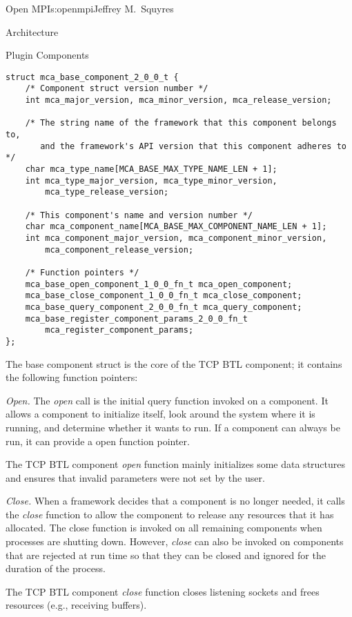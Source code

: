 \begin{aosachapter}{Open MPI}{s:openmpi}{Jeffrey M.\ Squyres}
\begin{aosasect1}{Architecture}
\begin{aosasect2}{Plugin Components}
\begin{verbatim}
struct mca_base_component_2_0_0_t {
    /* Component struct version number */
    int mca_major_version, mca_minor_version, mca_release_version;

    /* The string name of the framework that this component belongs to,
       and the framework's API version that this component adheres to */
    char mca_type_name[MCA_BASE_MAX_TYPE_NAME_LEN + 1];
    int mca_type_major_version, mca_type_minor_version,  
        mca_type_release_version;

    /* This component's name and version number */
    char mca_component_name[MCA_BASE_MAX_COMPONENT_NAME_LEN + 1];
    int mca_component_major_version, mca_component_minor_version,
        mca_component_release_version;

    /* Function pointers */  
    mca_base_open_component_1_0_0_fn_t mca_open_component;
    mca_base_close_component_1_0_0_fn_t mca_close_component;
    mca_base_query_component_2_0_0_fn_t mca_query_component;
    mca_base_register_component_params_2_0_0_fn_t 
        mca_register_component_params;
};
\end{verbatim}

The base component struct is the core of the TCP BTL component; it
contains the following function pointers:

\begin{aosaitemize}
\item \emph{Open.} The \emph{open} call is the initial query function
  invoked on a component.  It allows a component to initialize itself,
  look around the system where it is running, and determine whether it
  wants to run.  If a component can always be run, it can provide a
   open function pointer.

  The TCP BTL component \emph{open} function mainly initializes some
  data structures and ensures that invalid parameters were not set by
  the user.

\item \emph{Close.} When a framework decides that a component is no
  longer needed, it calls the \emph{close} function to allow the
  component to release any resources that it has allocated.  The close
  function is invoked on all remaining components when processes are
  shutting down.  However, \emph{close} can also be invoked on
  components that are rejected at run time so that they can be closed
  and ignored for the duration of the process.

  The TCP BTL component \emph{close} function closes listening sockets
  and frees resources (e.g., receiving buffers).


\end{aosaitemize}
\end{aosasect2}
\end{aosasect1}
\end{aosachapter}
